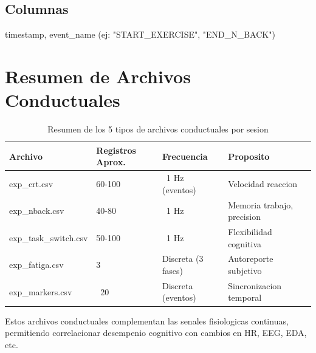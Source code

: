 \subsection{Columnas}

timestamp, event\_name (ej: "START\_EXERCISE", "END\_N\_BACK")

\section{Resumen de Archivos Conductuales}

\begin{table}[H]
\centering
\caption{Resumen de los 5 tipos de archivos conductuales por sesion}
\begin{tabular}{|l|l|l|l|}
\hline
\textbf{Archivo} & \textbf{Registros Aprox.} & \textbf{Frecuencia} & \textbf{Proposito} \\
\hline
exp\_crt.csv & 60-100 & ~1 Hz (eventos) & Velocidad reaccion \\
\hline
exp\_nback.csv & 40-80 & ~1 Hz & Memoria trabajo, precision \\
\hline
exp\_task\_switch.csv & 50-100 & ~1 Hz & Flexibilidad cognitiva \\
\hline
exp\_fatiga.csv & 3 & Discreta (3 fases) & Autoreporte subjetivo \\
\hline
exp\_markers.csv & ~20 & Discreta (eventos) & Sincronizacion temporal \\
\hline
\end{tabular}
\end{table}

Estos archivos conductuales complementan las senales fisiologicas continuas,
permitiendo correlacionar desempenio cognitivo con cambios en HR, EEG, EDA, etc.
